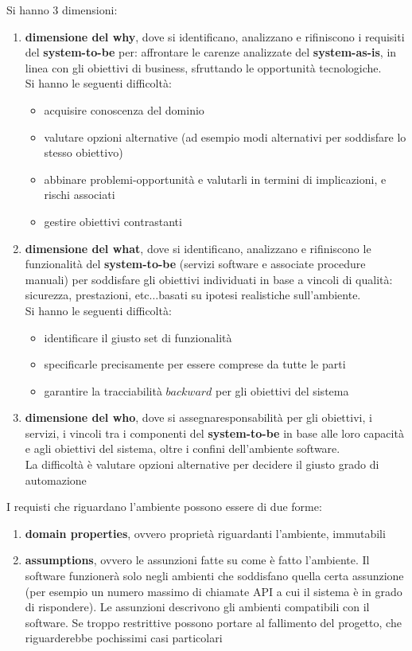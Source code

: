 \documentclass[a4paper,12pt, oneside]{book}
\begin{document}
Si hanno 3 dimensioni:
\begin{enumerate}
  \item \textbf{dimensione del why}, dove si identificano, analizzano e
  rifiniscono i requisiti del \textbf{system-to-be} per:
  affrontare le carenze analizzate del \textbf{system-as-is}, in linea con gli
  obiettivi di business, sfruttando le opportunità tecnologiche.\\
  Si hanno le seguenti difficoltà:
  \begin{itemize}
    \item acquisire conoscenza del dominio 
    \item valutare opzioni alternative (ad esempio modi alternativi per
    soddisfare lo stesso obiettivo) 
    \item abbinare problemi-opportunità e valutarli in termini di implicazioni,
    e rischi associati 
    \item gestire obiettivi contrastanti
  \end{itemize}

  \item \textbf{dimensione del what}, dove si identificano, analizzano e
  rifiniscono le funzionalità del \textbf{system-to-be} (servizi software e
  associate procedure manuali) per soddisfare gli obiettivi individuati in
  base a vincoli di qualità: sicurezza, prestazioni, etc$\ldots $basati su
  ipotesi realistiche sull'ambiente.\\
  Si hanno le seguenti difficoltà:
  \begin{itemize}
    \item identificare il giusto set di funzionalità 
    \item specificarle precisamente per essere comprese da tutte le parti 
    \item garantire la tracciabilità $backward$ per gli obiettivi del sistema
  \end{itemize}
  \item \textbf{dimensione del who}, dove si assegnaresponsabilità per gli
  obiettivi, i servizi, i vincoli tra i componenti del \textbf{system-to-be} in
  base alle loro capacità e agli obiettivi del sistema, oltre i confini
  dell'ambiente software.\\
  La difficoltà è valutare opzioni alternative per decidere il giusto grado di
  automazione 
\end{enumerate}
I requisti che riguardano l'ambiente possono essere di due forme:
\begin{enumerate}
  \item \textbf{domain properties}, ovvero proprietà riguardanti l'ambiente,
  immutabili
  \item \textbf{assumptions}, ovvero le assunzioni fatte su come è fatto
  l'ambiente. Il software funzionerà solo negli ambienti che soddisfano quella
  certa assunzione (per esempio un numero massimo di chiamate API a cui il
  sistema è in grado di rispondere). Le assunzioni descrivono gli ambienti
  compatibili con il software. Se troppo restrittive possono portare al
  fallimento del progetto, che riguarderebbe pochissimi casi particolari
\end{enumerate}
\end{document}

